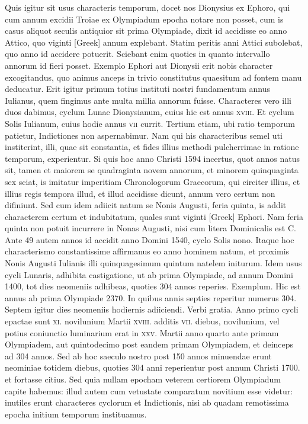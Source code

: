 Quis igitur sit usus characteris temporum, docet nos
Dionysius ex Ephoro, qui cum annum excidii Troiae ex Olympiadum
epocha notare non posset, cum is casus aliquot seculis antiquior
sit prima Olympiade, dixit id accidisse eo anno Attico, quo viginti
\textgreek{[Greek]} annum explebant.
Statim peritis anni Attici subolebat,
quo anno id accidere potuerit.
Sciebant enim quoties in quanto
intervallo annorum id fieri posset.
Exemplo Ephori aut Dionysii
erit nobis character excogitandus, quo animus anceps in trivio constitutus
quaesitum ad fontem manu deducatur.
Erit igitur primum
totius instituti nostri fundamentum annus Iulianus, quem fingimus
ante multa millia annorum fuisse.
Characteres vero illi duos dabimus,
cyclum Lunae Dionysianum, cuius hic est annus \textsc{xviii}.
Et cyclum
Solis Iulianum, cuius hodie annus \textsc{vii} currit.
Tertium etiam,
ubi ratio temporum patietur, Indictiones non aspernabimur.
Nam
qui his characteribus semel uti institerint, illi, quae sit constantia, et fides
illius methodi pulcherrimae in ratione temporum, experientur.
Si
quis hoc anno Christi 1594 incertus, quot annos natus sit, tamen et
maiorem se quadraginta novem annorum, et minorem quinquaginta
sex sciat, is imitatur imperitiam Chronologorum Graecorum, qui
circiter illius, et illius regis tempora illud, et illud accidisse dicunt, annum
vero certum non difiniunt.
Sed cum idem adiicit natum se Nonis
Augusti, feria quinta, is addit characterem certum et indubitatum,
quales sunt viginti \textgreek{[Greek]} Ephori.
Nam feria quinta non
potuit incurrere in Nonas Augusti, nisi cum litera Dominicalis est C.
Ante 49 autem annos id accidit anno Domini 1540, cyclo Solis nono.
Itaque hoc characterismo constantissime affirmanus eo anno hominem
natum, et proximis Nonis Augusti Iulianis illi quinquagesimum
quintum natelem initurum.
Idem usus cycli Lunaris, adhibita
castigatione, ut ab prima Olympiade, ad annum Domini 1400, tot
dies neomeniis adhibeas, quoties 304 annos reperies.
Exemplum.
Hic est annus ab prima Olympiade 2370.
In quibus annis septies reperitur
numerus 304.
Septem igitur dies neomeniis hodiernis adiiciendi.
Verbi gratia.
Anno primo cycli epactae sunt \textsc{xi}. novilunium
Martii \textsc{xviii}. additis
 \textsc{vii}. diebus, novilunium, vel potius coniunctio
luminarium erat in \textsc{xxv}.
Martii anno quarto ante primam Olympiadem,
aut quintodecimo post eandem primam Olympiadem, et deinceps
ad 304 annos.
Sed ab hoc saeculo nostro post 150 annos minuendae
erunt neominiae totidem diebus, quoties 304 anni reperientur
post annum Christi 1700. et fortasse citius.
Sed quia nullam epocham
veterem certiorem Olympiadum capite habemus: illud autem
cum vetustate comparatum novitium esse videtur: inutiles erunt characteres
cyclorum et Indictionis, nisi ab quadam remotissima epocha
initium temporum instituamus.

